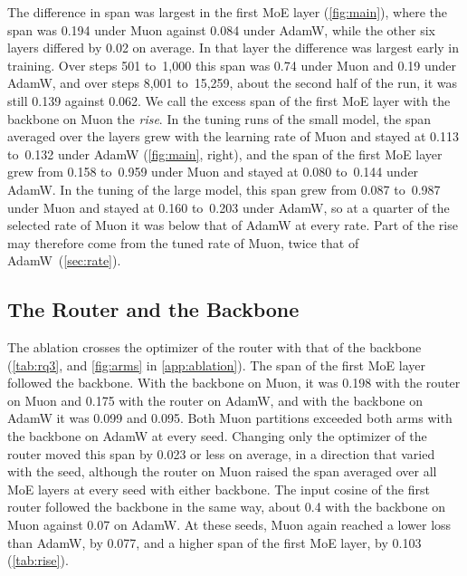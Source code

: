 \documentclass[11pt, a4paper]{article}
\begin{document}
The difference in span was largest in the first MoE layer (\cref{fig:main}), where the span was 0.194 under Muon against 0.084 under AdamW, while the other six layers differed by 0.02 on average. In that layer the difference was largest early in training. Over steps 501 to~1,000 this span was 0.74 under Muon and 0.19 under AdamW, and over steps 8,001 to~15,259, about the second half of the run, it was still 0.139 against 0.062. We call the excess span of the first MoE layer with the backbone on Muon the \emph{rise}. In the tuning runs of the small model, the span averaged over the layers grew with the learning rate of Muon and stayed at 0.113 to~0.132 under AdamW (\cref{fig:main}, right), and the span of the first MoE layer grew from 0.158 to~0.959 under Muon and stayed at 0.080 to~0.144 under AdamW\@. In the tuning of the large model, this span grew from 0.087 to~0.987 under Muon and stayed at 0.160 to~0.203 under AdamW, so at a quarter of the selected rate of Muon it was below that of AdamW at every rate. Part of the rise may therefore come from the tuned rate of Muon, twice that of AdamW~(\cref{sec:rate}).

\subsection{The Router and the Backbone}
\label{sec:backbone}

The ablation crosses the optimizer of the router with that of the backbone (\cref{tab:rq3}, and \cref{fig:arms} in \cref{app:ablation}). The span of the first MoE layer followed the backbone. With the backbone on Muon, it was 0.198 with the router on Muon and 0.175 with the router on AdamW, and with the backbone on AdamW it was 0.099 and 0.095. Both Muon partitions exceeded both arms with the backbone on AdamW at every seed. Changing only the optimizer of the router moved this span by 0.023 or less on average, in a direction that varied with the seed, although the router on Muon raised the span averaged over all MoE layers at every seed with either backbone. The input cosine of the first router followed the backbone in the same way, about 0.4 with the backbone on Muon against 0.07 on AdamW\@. At these seeds, Muon again reached a lower loss than AdamW, by 0.077, and a higher span of the first MoE layer, by 0.103 (\cref{tab:rise}).
\end{document}
